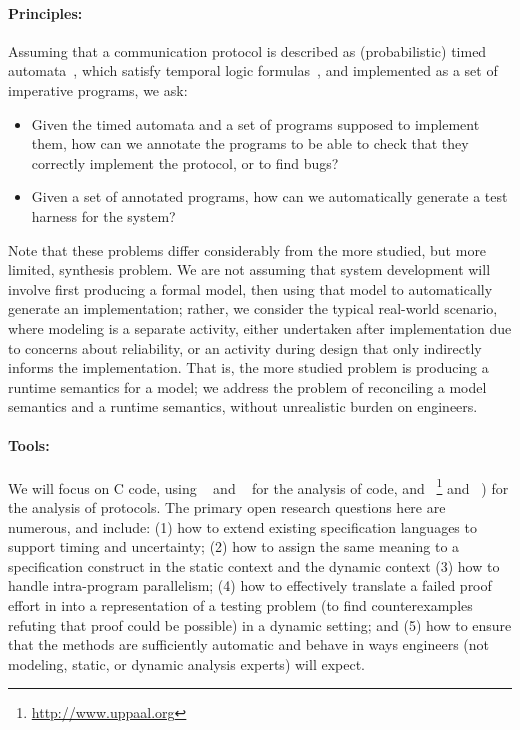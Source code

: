 \paragraph{Principles:} Assuming that a communication protocol is described
as (probabilistic) timed automata~\cite{AD1994:TCS},
which satisfy temporal logic
formulas~\cite{BLM2017:LNCS}, and implemented as a set of
imperative programs, we ask:
\begin{itemize}
\item Given the timed automata and a set of programs supposed to
  implement them, how can we annotate the programs to be able to check
  that they correctly implement the protocol, or to find bugs?
\item Given a set of annotated programs, how can we automatically
  generate a test harness for the system?
\end{itemize}

Note that these problems differ considerably from the more studied,
but more limited, synthesis problem.  We are not assuming that
system development will involve first producing a formal model, then
using that model to automatically generate an implementation; rather,
we consider the typical real-world scenario, where modeling is a
separate activity, either undertaken after implementation due to
concerns about reliability, or an activity during design that only
indirectly informs the implementation.  That is, the more studied
problem is producing a runtime semantics for a model; we address the
problem of reconciling a model semantics and a runtime semantics,
without unrealistic burden on engineers.


\paragraph{Tools:} We will focus on C code, using \framac~\cite{KKP2015:FAC} and \deepstate~\cite{DeepState}
for the analysis of code, and
\uppaal~\footnote{\url{http://www.uppaal.org}} and
\prism~\cite{KNP2011:CAV}) for the analysis of protocols.  The primary open research questions here are numerous, and include:
(1) how to extend existing specification languages to support timing and uncertainty;
(2) how to assign the same meaning to a specification construct in
  the static \framac context and the dynamic \deepstate context
(3) how to handle intra-program parallelism;
(4) how to effectively translate a failed proof effort in \framac
  into a representation of a testing problem (to find counterexamples
  refuting that proof could be possible) in a dynamic setting; and
(5) how to ensure that the methods are sufficiently automatic
  and behave in ways engineers (not modeling, static, or dynamic
  analysis experts) will expect.

